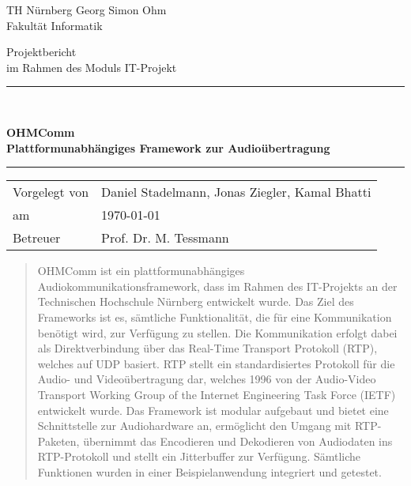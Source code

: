 \documentclass[11pt,a4paper]{report}
\begin{document}
\begin{titlepage}
  \begin{center}
    \parbox[t]{8cm}{
      TH Nürnberg Georg Simon Ohm\\
      Fakultät Informatik \\
	}
    \vfill    
    {\LARGE Projektbericht} \\[0.5cm]
    {\large im Rahmen des Moduls IT-Projekt} \\[5mm]
    \rule{\textwidth}{1pt}\\[0.5cm]
    {\begin{spacing}{1.15} \huge \bfseries OHMComm \\Plattformunabhängiges Framework zur Audioübertragung \\ \end{spacing}}
    \rule{\textwidth}{1pt}    
    \vfill    
    \begin{tabular}{ll} %
      Vorgelegt von & Daniel Stadelmann, Jonas Ziegler, Kamal Bhatti \\
      am & \today \\
      Betreuer & Prof. Dr. M. Tessmann \\
    \end{tabular}    
    \vfill
\end{center}
\end{titlepage}
\cleardoublepage

\begin{abstract} 
OHMComm ist ein plattformunabhängiges Audiokommunikationsframework, dass im Rahmen des IT-Projekts an der Technischen Hochschule Nürnberg entwickelt wurde. Das Ziel des Frameworks ist es, sämtliche Funktionalität, die für eine Kommunikation benötigt wird, zur Verfügung zu stellen. Die Kommunikation erfolgt dabei als Direktverbindung über das Real-Time Transport Protokoll (RTP), welches auf UDP basiert. RTP stellt ein standardisiertes Protokoll für die Audio- und Videoübertragung dar, welches 1996 von der Audio-Video Transport Working Group of the Internet Engineering Task Force (IETF) entwickelt wurde. Das Framework ist modular aufgebaut und bietet eine Schnittstelle zur Audiohardware an, ermöglicht den Umgang mit RTP-Paketen, übernimmt das Encodieren und Dekodieren von Audiodaten ins RTP-Protokoll und stellt ein Jitterbuffer zur Verfügung. Sämtliche Funktionen wurden in einer Beispielanwendung integriert und getestet.
\end{abstract}
\end{document}
